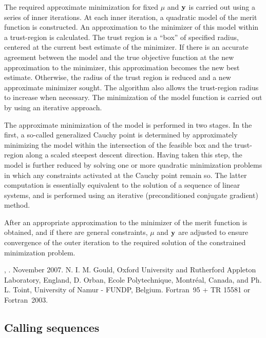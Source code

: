 \documentclass{galahad}
\newcommand{\fullpackagename}{LANC\-E\-LOT\-\_simple}
\begin{document}
The required approximate minimization for fixed $\mu$ and ${\mathbf{y}}$ is
carried out using a series of inner iterations.  At each inner
iteration, a quadratic model of the merit function is
constructed.  An approximation to the minimizer of this model within a
trust-region is calculated.  The trust region is a ``box''
of specified radius, centered at the current best estimate
of the minimizer.  If there is an accurate agreement between the model
and the true objective function at the new approximation to the
minimizer, this approximation becomes the new best estimate.  Otherwise,
the radius of the trust region is reduced and a new approximate
minimizer sought.  The algorithm also allows the trust-region radius to
increase when necessary. The minimization of the model function is
carried out by using an iterative approach.

The approximate minimization of the model is performed in two stages.
In the first, a so-called generalized Cauchy point is determined
by approximately minimizing the model within the intersection of
the feasible box and the trust-region along a scaled steepest descent
direction. Having taken this step, the model is further reduced
by solving one or more quadratic minimization problems in which
any constraints activated at the Cauchy point remain so. The latter
computation is essentially equivalent to the solution of a sequence
of linear systems, and is performed using an iterative (preconditioned
conjugate gradient) method.

After an appropriate approximation to the minimizer of the merit
function is obtained, and if there are general constraints,
$\mu$ and ${\mathbf{y}}$ are adjusted to ensure
convergence of the outer iteration to the required solution of the
constrained minimization problem.


\galattributes
\galversions{\tt  \fullpackagename\_double},
.
\galdate November 2007.
\galorigin N. I. M. Gould, Oxford University and Rutherford Appleton Laboratory,
England, D. Orban, Ecole Polytechnique, Montr\'{e}al, Canada, and
Ph. L. Toint, University of Namur - FUNDP, Belgium.
\gallanguage Fortran~95 + TR 15581 or Fortran~2003.


\galhowto

\subsection{Calling sequences}
\end{document}
